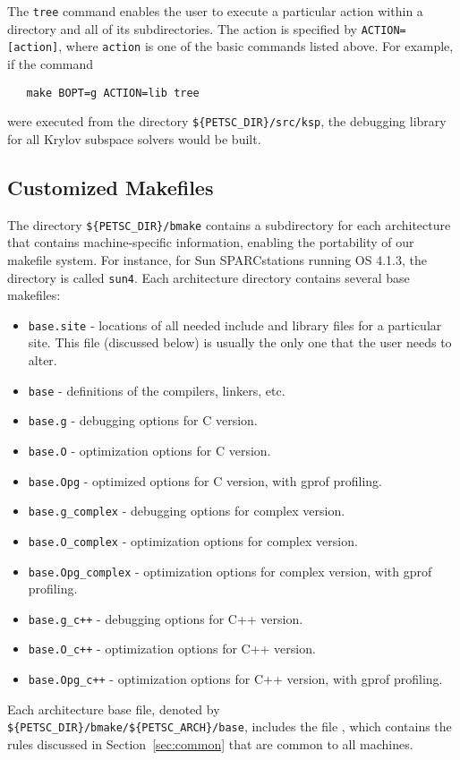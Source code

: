 The {\tt tree} command enables the user to execute a particular action
within a directory and all of its subdirectories.  The action is specified
by {\tt ACTION=[action]}, where {\tt action} is one of the basic commands
listed above. For example, if the command
\begin{verbatim}
   make BOPT=g ACTION=lib tree
\end{verbatim}
were executed from the directory {\tt \$\{PETSC\_DIR\}/src/ksp},
the debugging library for all Krylov subspace solvers would be built.

\subsection{Customized Makefiles}
\label{sec:custom}

The directory {\tt \$\{PETSC\_DIR\}/bmake} contains a subdirectory for each 
architecture that contains machine-specific information, enabling the
portability of our makefile system.
For instance, for Sun SPARCstations running OS 4.1.3, the 
directory is called {\tt sun4}.  Each architecture directory contains
several base makefiles:
\begin{itemize}
\item {\tt base.site} - locations of all needed include
      and library files for a particular site. This file (discussed
      below) is usually the only one that the user needs to alter.
\item {\tt base} - definitions of the compilers,
      linkers, etc.
\item {\tt base.g} - debugging options for C version.
\item {\tt base.O} - optimization options for C version.
\item {\tt base.Opg} - optimized options for C version, with gprof profiling.
\item {\tt base.g\_complex} - debugging options for complex version.
\item {\tt base.O\_complex} - optimization options for complex version.
\item {\tt base.Opg\_complex} - optimization options for complex version, with 
                              gprof profiling.
\item {\tt base.g\_c++} - debugging options for C++ version.
\item {\tt base.O\_c++} - optimization options for C++ version.
\item {\tt base.Opg\_c++} - optimization options for C++ version, with gprof
                            profiling.
\end{itemize}
Each architecture base file, denoted by
{\tt \$\{PETSC\_DIR\}/bmake/\$\{PETSC\_ARCH\}/base},
includes the file ,
which contains the rules discussed in Section~\ref{sec:common}
that are common to all machines.

